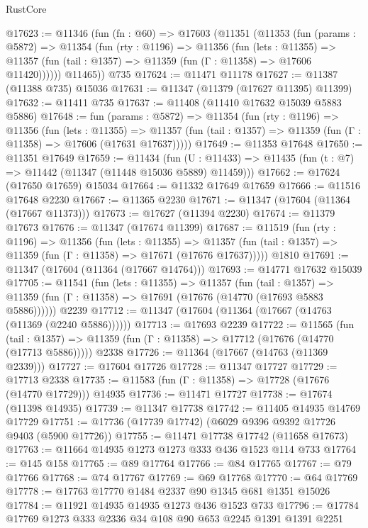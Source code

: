 \begin{lexlean}{RustCore}
\begin{coremodule}
@17623 := @11346
    (fun (fn : @60) =>
    @17603
      (@11351
        (@11353
          (fun (params : @5872) =>
          @11354
            (fun (rty : @1196) =>
            @11356
              (fun (lets : @11355) =>
              @11357 (fun (tail : @1357) => @11359 (fun (Γ : @11358) => @17606 @11420))))))
        @11465))
    @735
@17624 := @11471 @11178
@17627 := @11387 (@11388 @735) @15036
@17631 := @11347 (@11379 (@17627 @11395) @11399)
@17632 := @11411 @735
@17637 := @11408 (@11410 @17632 @15039 @5883 @5886)
@17648 := fun (params : @5872) =>
  @11354
    (fun (rty : @1196) =>
    @11356
      (fun (lets : @11355) =>
      @11357 (fun (tail : @1357) => @11359 (fun (Γ : @11358) => @17606 (@17631 @17637)))))
@17649 := @11353 @17648
@17650 := @11351 @17649
@17659 := @11434
    (fun (U : @11433) => @11435 (fun (t : @7) => @11442 (@11347 (@11448 @15036 @5889) @11459)))
@17662 := @17624 (@17650 @17659) @15034
@17664 := @11332 @17649 @17659
@17666 := @11516 @17648 @2230
@17667 := @11365 @2230
@17671 := @11347 (@17604 (@11364 (@17667 @11373)))
@17673 := @17627 (@11394 @2230)
@17674 := @11379 @17673
@17676 := @11347 (@17674 @11399)
@17687 := @11519
    (fun (rty : @1196) =>
    @11356
      (fun (lets : @11355) =>
      @11357 (fun (tail : @1357) => @11359 (fun (Γ : @11358) => @17671 (@17676 @17637)))))
    @1810
@17691 := @11347 (@17604 (@11364 (@17667 @14764)))
@17693 := @14771 @17632 @15039
@17705 := @11541
    (fun (lets : @11355) =>
    @11357
      (fun (tail : @1357) =>
      @11359 (fun (Γ : @11358) => @17691 (@17676 (@14770 (@17693 @5883 @5886))))))
    @2239
@17712 := @11347 (@17604 (@11364 (@17667 (@14763 (@11369 (@2240 @5886))))))
@17713 := @17693 @2239
@17722 := @11565
    (fun (tail : @1357) => @11359 (fun (Γ : @11358) => @17712 (@17676 (@14770 (@17713 @5886)))))
    @2338
@17726 := @11364 (@17667 (@14763 (@11369 @2339)))
@17727 := @17604 @17726
@17728 := @11347 @17727
@17729 := @17713 @2338
@17735 := @11583 (fun (Γ : @11358) => @17728 (@17676 (@14770 @17729))) @14935
@17736 := @11471 @17727
@17738 := @17674 (@11398 @14935)
@17739 := @11347 @17738
@17742 := @11405 @14935 @14769 @17729
@17751 := @17736 (@17739 @17742) (@6029 @9396 @9392 @17726 @9403 (@5900 @17726))
@17755 := @11471 @17738 @17742 (@11658 @17673)
@17763 := @11664 @14935 @1273 @1273 @333 @436 @1523 @114 @733
@17764 := @145 @158
@17765 := @89 @17764
@17766 := @84 @17765
@17767 := @79 @17766
@17768 := @74 @17767
@17769 := @69 @17768
@17770 := @64 @17769
@17778 := @17763 @17770 @1484 @2337 @90 @1345 @681 @1351 @15026
@17784 := @11921 @14935 @14935 @1273 @436 @1523 @733
@17796 := @17784 @17769 @1273 @333 @2336 @34 @108 @90 @653 @2245 @1391 @1391 @2251

\end{coremodule}
\end{lexlean}
